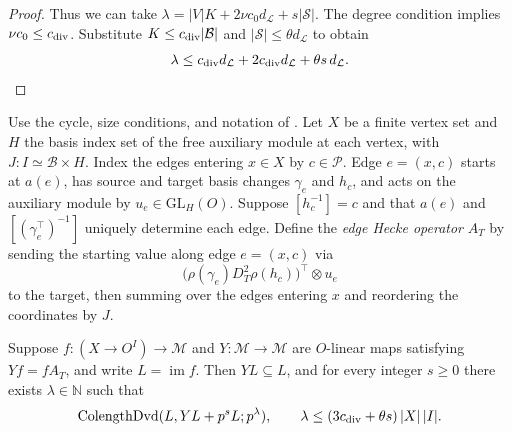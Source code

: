 \begin{proof}
Thus we can take $\lambda=|V|K+2\nu c_0 d_{\mathcal L}+s|\mathcal S|$. The degree condition implies $\nu c_0\le c_{\rm div}$. Substitute $K\le c_{\rm div}|\mathcal B|$ and $|\mathcal S|\le\theta d_{\mathcal L}$ to obtain
\[
 \lambda\le c_{\rm div}d_{\mathcal L}
        +2c_{\rm div}d_{\mathcal L}+\theta s\,d_{\mathcal L}.
\]
\end{proof}

\begin{theorem}
\label{thm:a-edge-elementary-divisors}
\emitthmsource
Use the cycle, size conditions, and notation of . Let $X$ be a finite vertex set and $H$ the basis index set of the free auxiliary module at each vertex, with $J:I\simeq\mathcal B\times H$. Index the edges entering $x\in X$ by $c\in\mathcal P$. Edge $e=(x,c)$ starts at $a(e)$, has source and target basis changes $\gamma_e$ and $h_c$, and acts on the auxiliary module by $u_e\in\mathrm{GL}_H(O)$. Suppose $[h_c^{-1}]=c$ and that $a(e)$ and $[(\gamma_e^\top)^{-1}]$ uniquely determine each edge. Define the \emph{edge Hecke operator} $A_T$ by sending the starting value along edge $e=(x,c)$ via
\[
 \bigl(\rho(\gamma_e)D_T^2\rho(h_c)\bigr)^\top\otimes u_e
\]
to the target, then summing over the edges entering $x$ and reordering the coordinates by $J$.

Suppose $f:(X\to O^I)\to\mathcal M$ and $Y:\mathcal M\to\mathcal M$ are $O$-linear maps satisfying $Yf=fA_T$, and write $L=\operatorname{im}f$. Then $YL\subseteq L$, and for every integer $s\ge0$ there exists $\lambda\in\mathbb N$ such that
\[
 \operatorname{ColengthDvd}(L,YL+p^sL;p^\lambda),
 \qquad
 \lambda\le (3c_{\rm div}+\theta s)\,|X|\,|I|.
\]
\end{theorem}

